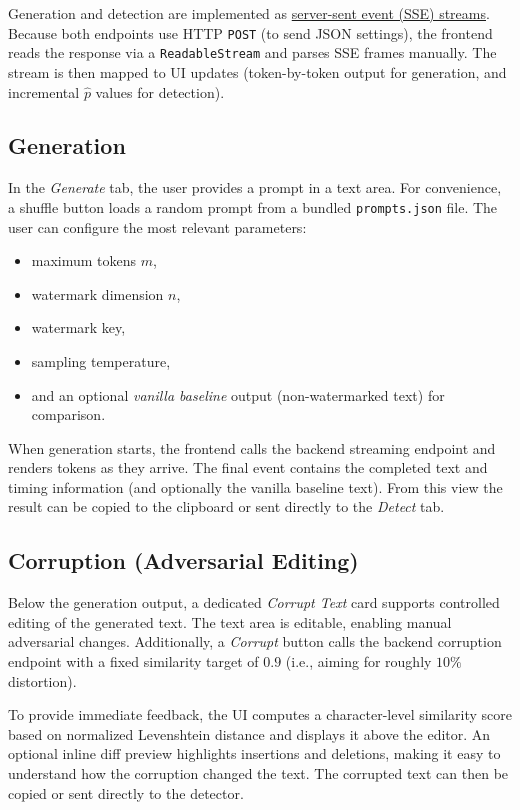 Generation and detection are implemented as \href{https://developer.mozilla.org/en-US/docs/Web/API/Server-sent_events}{server-sent event (SSE) streams}.
Because both endpoints use HTTP \texttt{POST} (to send JSON settings), the frontend reads the response via a \texttt{ReadableStream} and parses SSE frames manually.
The stream is then mapped to UI updates (token-by-token output for generation, and incremental $\hat{p}$ values for detection).

\subsection{Generation}
In the \emph{Generate} tab, the user provides a prompt in a text area.
For convenience, a shuffle button loads a random prompt from a bundled \texttt{prompts.json} file.
The user can configure the most relevant parameters:
\begin{itemize}
    \item maximum tokens $m$,
    \item watermark dimension $n$,
    \item watermark key,
    \item sampling temperature,
    \item and an optional \emph{vanilla baseline} output (non-watermarked text) for comparison.
\end{itemize}

When generation starts, the frontend calls the backend streaming endpoint and renders tokens as they arrive.
The final event contains the completed text and timing information (and optionally the vanilla baseline text).
From this view the result can be copied to the clipboard or sent directly to the \emph{Detect} tab.

\subsection{Corruption (Adversarial Editing)}
Below the generation output, a dedicated \emph{Corrupt Text} card supports controlled editing of the generated text.
The text area is editable, enabling manual adversarial changes.
Additionally, a \emph{Corrupt} button calls the backend corruption endpoint with a fixed similarity target of $0.9$ (i.e., aiming for roughly $10\%$ distortion).

To provide immediate feedback, the UI computes a character-level similarity score based on normalized Levenshtein distance and displays it above the editor.
An optional inline diff preview highlights insertions and deletions, making it easy to understand how the corruption changed the text.
The corrupted text can then be copied or sent directly to the detector.

